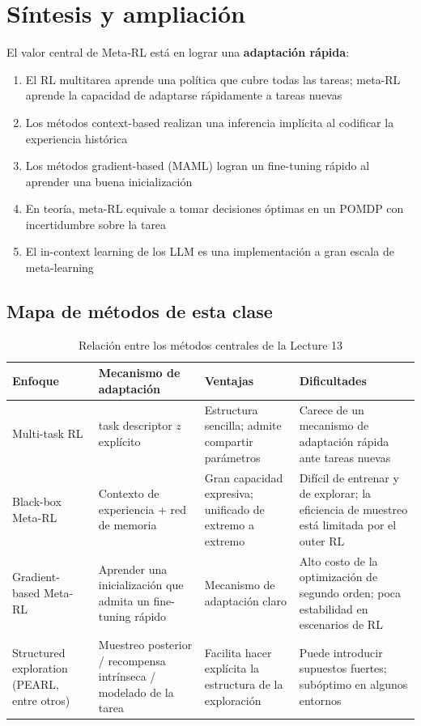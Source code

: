 \section{Síntesis y ampliación}

El valor central de Meta-RL está en lograr una \textbf{adaptación rápida}:

\begin{enumerate}
    \item El RL multitarea aprende una política que cubre todas las tareas; meta-RL aprende la capacidad de adaptarse rápidamente a tareas nuevas
    \item Los métodos context-based realizan una inferencia implícita al codificar la experiencia histórica
    \item Los métodos gradient-based (MAML) logran un fine-tuning rápido al aprender una buena inicialización
    \item En teoría, meta-RL equivale a tomar decisiones óptimas en un POMDP con incertidumbre sobre la tarea
    \item El in-context learning de los LLM es una implementación a gran escala de meta-learning
\end{enumerate}

\subsection{Mapa de métodos de esta clase}

\begin{table}[H]
\centering
\begin{tabular}{p{} p{} p{} p{}}
\toprule
Enfoque & Mecanismo de adaptación & Ventajas & Dificultades \\
\midrule
Multi-task RL & task descriptor $z$ explícito & Estructura sencilla; admite compartir parámetros & Carece de un mecanismo de adaptación rápida ante tareas nuevas \\
Black-box Meta-RL & Contexto de experiencia + red de memoria & Gran capacidad expresiva; unificado de extremo a extremo & Difícil de entrenar y de explorar; la eficiencia de muestreo está limitada por el outer RL \\
Gradient-based Meta-RL & Aprender una inicialización que admita un fine-tuning rápido & Mecanismo de adaptación claro & Alto costo de la optimización de segundo orden; poca estabilidad en escenarios de RL \\
Structured exploration (PEARL, entre otros) & Muestreo posterior / recompensa intrínseca / modelado de la tarea & Facilita hacer explícita la estructura de la exploración & Puede introducir supuestos fuertes; subóptimo en algunos entornos \\
\bottomrule
\end{tabular}
\caption{Relación entre los métodos centrales de la Lecture 13}
\end{table}

